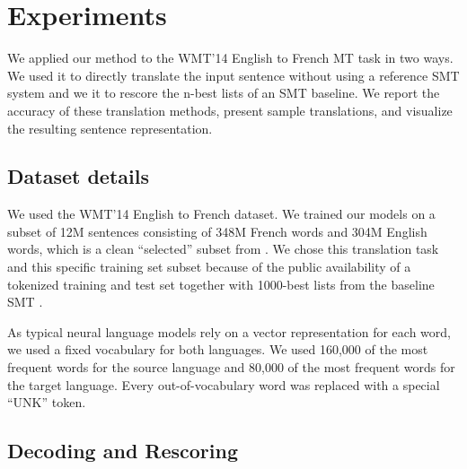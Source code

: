 \documentclass{article}
\begin{document}
\section{Experiments}
\label{sec:experiments}
 
We applied our method to the WMT'14 English to French MT task in two
ways.  We used it to directly translate the input sentence without
using a reference SMT system and we it to rescore the n-best lists of
an SMT baseline.  We report the accuracy of these translation methods,
present sample translations, and visualize the resulting sentence
representation.

\subsection{Dataset details}

We used the WMT'14 English to French dataset.  We trained our models
on a subset of 12M sentences consisting of 348M French words and 304M
English words, which is a clean ``selected'' subset from
\cite{wmt14_en_fr}. We chose this translation task and this specific
training set subset because of the public availability of a tokenized training and
test set together with 1000-best lists from the baseline SMT 
\cite{wmt14_en_fr}.

As typical neural language models rely on a vector representation for
each word, we used a fixed vocabulary for both languages.  We used
160,000 of the most frequent words for the source language and 80,000
of the most frequent words for the target language.  Every
out-of-vocabulary word was replaced with a special ``UNK'' token.  
 
\subsection{Decoding and Rescoring}
\end{document}
